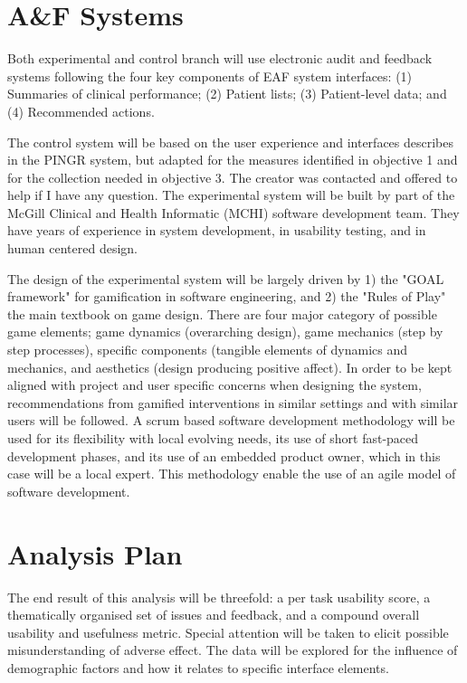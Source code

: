 \section{A\&F Systems}
Both experimental and control branch will use electronic audit and feedback systems following the four key components of \gls{EAF} system interfaces: (1) Summaries of clinical performance; (2) Patient lists; (3) Patient-level data; and (4) Recommended actions.\cite{brown2015meta}

The control system will be based on the user experience and interfaces describes in the PINGR system\cite{brown2016interface}, but adapted for the measures identified in objective 1 and for the collection needed in objective 3. The creator was contacted and offered to help if I have any question. The experimental system will be built by part of the McGill Clinical and Health Informatic (MCHI) software development team. They have years of experience in system development, in usability testing, and in human centered design.\cite{shaban2017pophr}\cite{lavigne2013hybrid}\cite{buckeridge2016developing}

The design of the experimental system will be largely driven by 1) the "GOAL framework" for gamification in software engineering\cite{garcia2017framework}, and 2) the "Rules of Play" the main textbook on game design\cite{salen2004rules}. There are four major category of possible game elements; game dynamics (overarching design), game mechanics (step by step processes), specific components (tangible elements of dynamics and mechanics, and aesthetics (design producing positive affect).\cite{mckeown2016gamification} In order to be kept aligned with project and user specific concerns when designing the system, recommendations from gamified interventions in similar settings and with similar users will be followed.\cite{mckeown2016gamification} A scrum based software development methodology will be used for its flexibility with local evolving needs, its use of short fast-paced development phases, and its use of an embedded product owner, which in this case will be a local expert.\cite{cohn2010succeeding} This methodology enable the use of an agile model of software development.\cite{beck2001manifesto}

\section{Analysis Plan}
The end result of this analysis will be threefold: a per task usability score, a thematically organised set of issues and feedback, and a compound overall usability and usefulness metric. Special attention will be taken to elicit possible misunderstanding of adverse effect. The data will be explored for the influence of demographic factors and how it relates to specific interface elements.

